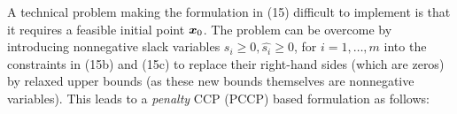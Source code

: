 \phantom{m}

\noindent
A technical problem making the formulation in (15) difficult to implement is that it requires a feasible initial point $\mbox{\boldmath$x$}_0$. The problem can be overcome by introducing nonnegative slack variables {$s_i \geq 0, \hat{s_i} \geq 0$, for $i =1, \ldots, m$} into the constraints in (15b) and (15c) to replace their right-hand sides (which are zeros) by relaxed upper bounds (as these new bounds themselves are nonnegative variables). This leads to a \textit{penalty} CCP (PCCP) based formulation as follows: 
%
%
